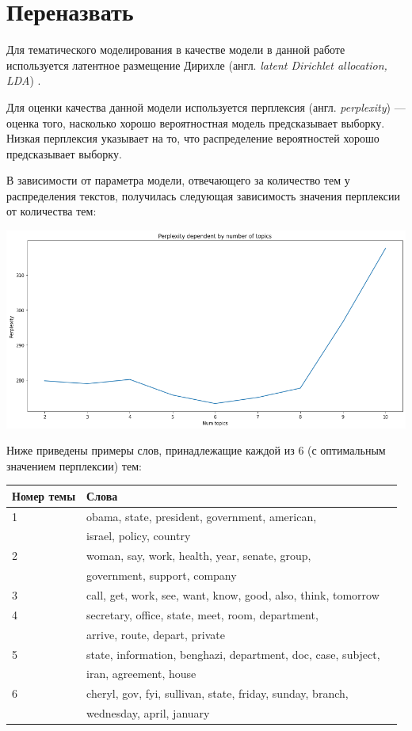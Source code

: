 \section{Переназвать}

Для тематического моделирования в качестве модели в данной работе используется латентное размещение Дирихле (англ. \textit{latent Dirichlet allocation, LDA}) \cite{bib4}.

Для оценки качества данной модели используется перплексия (англ. \textit{perplexity}) --- оценка того, насколько хорошо вероятностная модель предсказывает выборку. Низкая перплексия указывает на то, что распределение вероятностей хорошо предсказывает выборку. 

В зависимости от параметра модели, отвечающего за количество тем у распределения текстов, получилась следующая зависимость значения перплексии от количества тем:

\includegraphics[scale=0.5]{pics/perplexity.png}

Ниже приведены примеры слов, принадлежащие каждой из 6 (с оптимальным значением перплексии) тем:

\begin{tabular}{ | l | l | l | }
\hline
Номер темы & Слова \\ \hline
1 & obama, state, president, government, american, \\ & israel,  policy, country \\ \hline
2 & woman, say, work, health, year, senate, group, \\ & government,  support, company \\ \hline
3 & call, get, work, see, want, know, good, also, think, tomorrow \\ \hline
4 & secretary, office, state, meet, room, department,  \\ &  arrive, route, depart, private \\ \hline 
5 & state, information, benghazi, department, doc, case, subject, \\ & iran, agreement, house \\ \hline
6 & cheryl, gov, fyi, sullivan, state, friday, sunday, branch,  \\ & wednesday, april, january \\ \hline 

\end{tabular}


